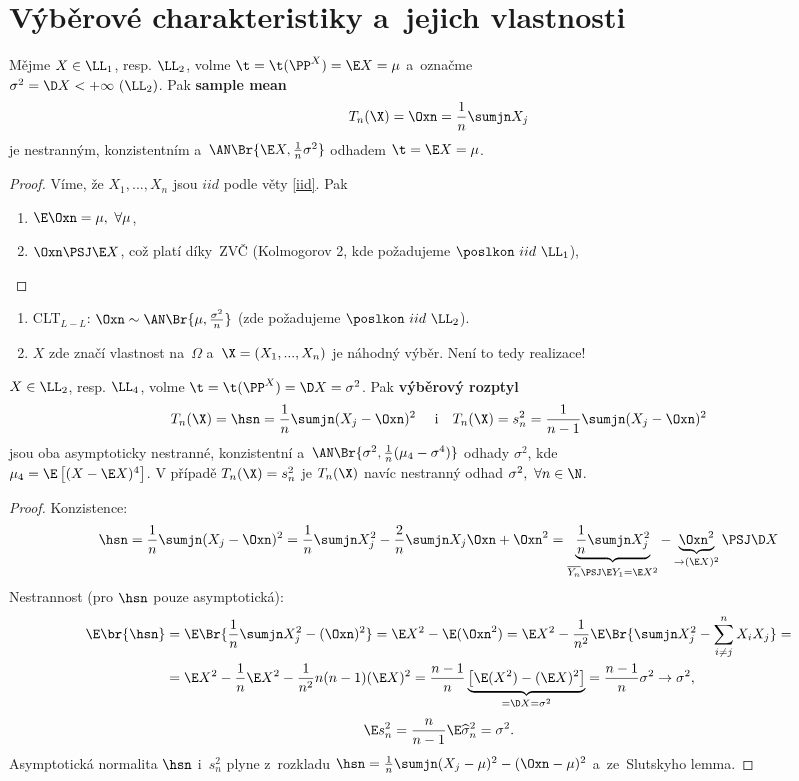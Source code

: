\section{Výběrové charakteristiky a~jejich vlastnosti}
\begin{theorem}
	Mějme $X\in\LL_1$, resp. $\LL_2$, volme $\t=\t(\PP^X)=\E X=\mu$ a~označme \\$\sigma^2=\D X<+\infty~(\LL_2)$. Pak \textbf{sample mean} $$T_n(\X)=\Oxn=\frac{1}{n}\sumjn X_j$$ je nestranným, konzistentním a~$\AN\Br{\E X,\frac{1}{n}\sigma^2}$ odhadem $\t=\E X=\mu$.\begin{proof}Víme, že $X_1,...,X_n$ jsou $iid$ podle věty \ref{iid}. Pak
		\begin{enumerate} 
			\item $\E \Oxn=\mu,~\forall\mu$,
			\item $\Oxn\PSJ\E X$, což platí díky~ZVČ (Kolmogorov 2, kde požadujeme $\poslkon~iid ~\LL_1$),
		\end{enumerate}
	\end{proof}
\end{theorem}
\begin{remark}
	\begin{enumerate}
		\item CLT$_{L-L}$: $\Oxn\sim\AN\Br{\mu,\frac{\sigma^2}{n}}$ (zde požadujeme $\poslkon~iid~\LL_2$).
		\item 	$X$ zde značí vlastnost na~$\Omega$ a~$\X=(X_1,...,X_n)$ je náhodný výběr. Není to tedy realizace!
	\end{enumerate}

\end{remark}
\begin{theorem}
	$X\in\LL_2$, resp. $\LL_4$, volme $\t=\t(\PP^X)=\D X=\sigma^2$. Pak \textbf{výběrový rozptyl} $$T_n(\X)=\hsn=\frac{1}{n}\sumjn(X_j-\Oxn)^2\text{ \quad i\quad  }T_n(\X)=s_n^2=\frac{1}{n-1}\sumjn(X_j-\Oxn)^2$$ jsou oba asymptoticky nestranné, konzistentní a~$\AN\Br{\sigma^2,\frac{1}{n}(\mu_4-\sigma^4)}$ odhady $\sigma^2$, kde\\ $\mu_4=\E\left[ (X-\E X)^4 \right]$.
	V případě $T_n(\X)=s_n^2$ je $T_n(\X)$ navíc nestranný odhad $\sigma^2,~\forall n\in\N$.
	\begin{proof}Konzistence:
		$$ \hsn=\frac{1}{n}\sumjn(X_j-\Oxn)^2=\frac{1}{n}\sumjn X_j^2-\frac{2}{n}\sumjn X_j\Oxn+\Oxn^2=\underbrace{\frac{1}{n}\sumjn X_j^2}_{\overline{Y_n}\PSJ \E Y_1=\E X^2}-\underbrace{\Oxn^2}_{\to(\E X)^2}\PSJ \D X $$
		Nestrannost (pro $\hsn$ pouze asymptotická):
		\[
		\begin{split}
		\E\br{\hsn}&=\E \Br{\frac{1}{n}\sumjn X_j^2-(\Oxn)^2}=\E X^2-\E(\Oxn^2)=\E X^2-\frac{1}{n^2}\E\Br{\sumjn X_j^2-\sum\limits_{i\neq j}^nX_iX_j}=\\&=\E X^2-\frac{1}{n}\E X^2-\frac{1}{n^2}n(n-1)(\E X)^2=\frac{n-1}{n}\underbrace{\left[ \E (X^2)-(\E X)^2 \right]}_{=\D X=\sigma^2} =\frac{n-1}{n}\sigma^2\to \sigma^2,
		\end{split}
		\]
		$$ \E s_n^2=\frac{n}{n-1}\E \widehat{\sigma}_n^2=\sigma^2. $$ Asymptotická normalita $\hsn$ i~$s_n^2$ plyne z~rozkladu $\hsn=\frac{1}{n}\sumjn(X_j-\mu)^2-(\Oxn-\mu)^2$ a~ze~Slutskyho lemma.
	\end{proof}
\end{theorem}
